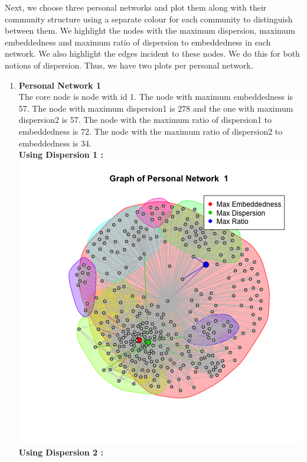 \documentclass{article}
\begin{document}
Next, we choose three personal networks and plot them along with their community structure using a separate colour for 
each community to distinguish between them. We highlight the nodes with the maximum dispersion, maximum embeddedness
and maximum ratio of dispersion to embeddedness in each network. We also highlight the edges incident to these nodes. We do this for both notions of dispersion. Thus, we have 
two plots per personal network.\\
\begin{enumerate}
 \item \textbf{Personal Network 1}\\
 The core node is node with id 1. The node with maximum embeddedness is 57.
 The node with maximum dispersion1 is 278 and the one with maximum dispersion2 is 57.
 The node with the maximum ratio of dispersion1 to embeddedness is 72.
 The node with the maximum ratio of dispersion2 to embeddedness is 34.\\
 \textbf{Using Dispersion 1 :}\\
 \includegraphics[scale=0.4]{d11} \\
 \textbf{Using Dispersion 2 :}\\

\end{enumerate}
\end{document}
